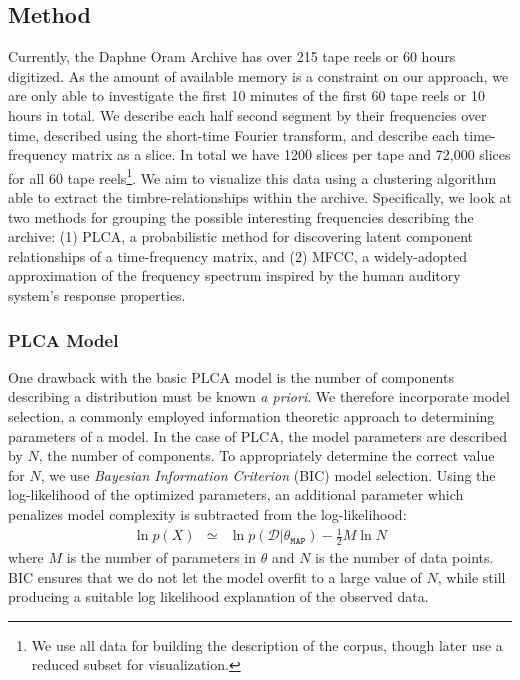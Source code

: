 \documentclass[a4paper,10pt,final]{ThesisStyle}
\begin{document}
\subsection{Method}

Currently, the Daphne Oram Archive has over 215 tape reels or 60 hours digitized.  As the amount of available memory is a constraint on our approach, we are only able to investigate the first 10 minutes of the first 60 tape reels or 10 hours in total.  We describe each half second segment by their frequencies over time, described using the short-time Fourier transform, and describe each time-frequency matrix as a slice.  In total we have 1200 slices per tape and 72,000 slices for all 60 tape reels\footnote{We use all data for building the description of the corpus, though later use a reduced subset for visualization.}.  We aim to visualize this data using a clustering algorithm able to extract the timbre-relationships within the archive.  Specifically, we look at two methods for grouping the possible interesting frequencies describing the archive: (1) PLCA, a probabilistic method for discovering latent component relationships of a time-frequency matrix, and (2) MFCC, a widely-adopted approximation of the frequency spectrum inspired by the human auditory system's response properties.

\subsubsection{PLCA Model}
One drawback with the basic PLCA model is the number of components describing a distribution must be known \textit{a priori}.  We therefore incorporate model selection, a commonly employed information theoretic approach to determining parameters of a model.  In the case of PLCA, the model parameters are described by $N$, the number of components.  To appropriately determine the correct value for $N$, we use \textit{Bayesian Information Criterion} (BIC) model selection.  Using the log-likelihood of the optimized parameters, an additional parameter which penalizes model complexity is subtracted from the log-likelihood:
\begin{eqnarray}
\ln{p(X)} &\simeq& \ln{p(\mathcal{D}|\theta_{\mathtt{MAP}})} - \frac{1}{2}M\ln{N}
\end{eqnarray}
where $M$ is the number of parameters in $\theta$ and $N$ is the number of data points.  BIC ensures that we do not let the model overfit to a large value of $N$, while still producing a suitable log likelihood explanation of the observed data.
\end{document}

